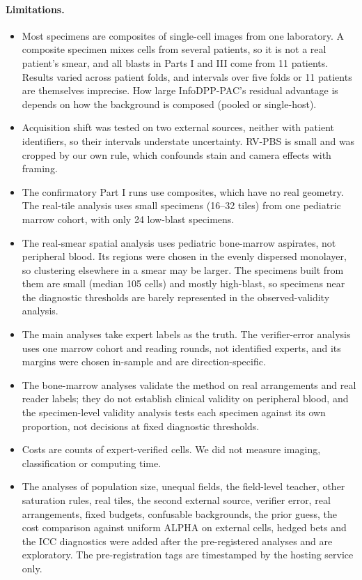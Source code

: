 \documentclass[11pt]{article}
\theoremstyle{remark}
\theoremstyle{definition}
\begin{document}
\paragraph{Limitations.}
\begin{itemize}
\item Most specimens are composites of single-cell images from one laboratory. A composite specimen mixes cells from several patients, so it is not a real patient's smear, and all blasts in Parts I and III come from 11 patients. Results varied across patient folds, and intervals over five folds or 11 patients are themselves imprecise. How large InfoDPP-PAC's residual advantage is depends on how the background is composed (pooled or single-host).
\item Acquisition shift was tested on two external sources, neither with patient identifiers, so their intervals understate uncertainty. RV-PBS is small and was cropped by our own rule, which confounds stain and camera effects with framing.
\item The confirmatory Part I runs use composites, which have no real geometry. The real-tile analysis uses small specimens (16--32 tiles) from one pediatric marrow cohort, with only 24 low-blast specimens.
\item The real-smear spatial analysis uses pediatric bone-marrow aspirates, not peripheral blood. Its regions were chosen in the evenly dispersed monolayer, so clustering elsewhere in a smear may be larger. The specimens built from them are small (median 105 cells) and mostly high-blast, so specimens near the diagnostic thresholds are barely represented in the observed-validity analysis.
\item The main analyses take expert labels as the truth. The verifier-error analysis uses one marrow cohort and reading rounds, not identified experts, and its margins were chosen in-sample and are direction-specific.
\item The bone-marrow analyses validate the method on real arrangements and real reader labels; they do not establish clinical validity on peripheral blood, and the specimen-level validity analysis tests each specimen against its own proportion, not decisions at fixed diagnostic thresholds.
\item Costs are counts of expert-verified cells. We did not measure imaging, classification or computing time.
\item The analyses of population size, unequal fields, the field-level teacher, other saturation rules, real tiles, the second external source, verifier error, real arrangements, fixed budgets, confusable backgrounds, the prior guess, the cost comparison against uniform ALPHA on external cells, hedged bets and the ICC diagnostics were added after the pre-registered analyses and are exploratory. The pre-registration tags are timestamped by the hosting service only.

\end{itemize}
\end{document}
